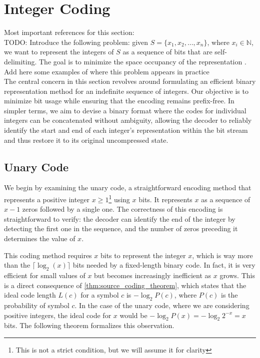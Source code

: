 \clearpage
\section{Integer Coding} \label{sec:integer_coding}

Most important references for this section: \cite{ferragina2023pearls,sayood2002lossless,navarro2016compact} \\

\noindent TODO: Introduce the following problem: given $S=\{x_1,x_2,\ldots,x_n\}$, where $x_i\in\mathbb{N}$, we want to represent the integers of $S$ as a sequence of bits that are self-delimiting. The goal is to minimize the space occupancy of the representation \cite{ferragina2023pearls}. Add here some examples of where this problem appears in practice \cite{witten1999managing} \\

\noindent The central concern in this section revolves around formulating an efficient binary representation method for an indefinite sequence of integers. Our objective is to minimize bit usage while ensuring that the encoding remains prefix-free. In simpler terms, we aim to devise a binary format where the codes for individual integers can be concatenated without ambiguity, allowing the decoder to reliably identify the start and end of each integer's representation within the bit stream and thus restore it to its original uncompressed state.

\subsection{Unary Code}
We begin by examining the unary code, a straightforward encoding method that represents a positive integer $x \geq 1$\footnote{This is not a strict condition, but we will assume it for clarity} using $x$ bits. It represents $x$ as a sequence of $x-1$ zeros followed by a single one. The correctness of this encoding is straightforward to verify: the decoder can identify the end of the integer by detecting the first one in the sequence, and the number of zeros preceding it determines the value of $x$. \vspace{0.4cm}

\noindent This coding method requires $x$ bits to represent the integer $x$, which is way more than the $\lceil\log_2(x)\rceil$ bits needed by a fixed-length binary code. In fact, it is very efficient for small values of $x$ but becomes increasingly inefficient as $x$ grows. This is a direct consequence of \autoref{thm:source_coding_theorem}, which states that the ideal code length $L(c)$ for a symbol $c$ is $-\log_2 P(c)$, where $P(c)$ is the probability of symbol $c$. In the case of the unary code, where we are considering positive integers, the ideal code for $x$ would be $-\log_2 P(x) = -\log_2 2^{-x} = x$ bits. The following theorem formalizes this observation. \cite{ferragina2023pearls}

